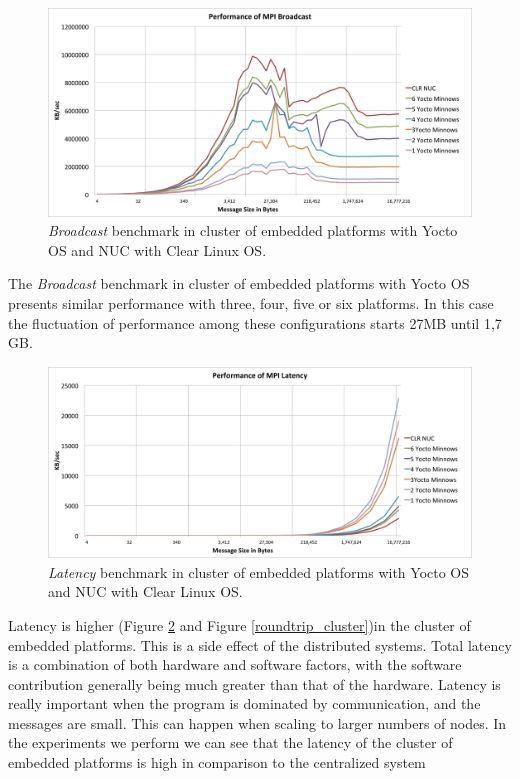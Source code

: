 \begin{figure}
  \includegraphics[width=\paperwidth]{images/mpbench_cluster_experiments/mpi_broadcast.png}
\caption{\textit{Broadcast} benchmark in cluster of embedded platforms with Yocto OS and NUC
with Clear Linux OS.}
\label{broadcast_cluster}
\end{figure}

The \textit{Broadcast} benchmark in cluster of embedded platforms with Yocto OS
presents similar performance with three, four, five or six platforms. In this
case the fluctuation of performance among these configurations starts 27MB
until 1,7 GB.

\begin{figure}
  \includegraphics[width=\paperwidth]{images/mpbench_cluster_experiments/mpi_latency.png}
\caption{\textit{Latency} benchmark in cluster of embedded platforms with Yocto OS and NUC
with Clear Linux OS.}
\label{latency_cluster}
\end{figure}

Latency is higher (Figure \ref{latency_cluster} and Figure
\ref{roundtrip_cluster})in the cluster of embedded platforms.  This is a side
effect of the distributed systems.  Total latency is a combination of both
hardware and software factors, with the software contribution generally being
much greater than that of the hardware. Latency is really important when the
program is dominated by communication, and the messages are small.  This can
happen when scaling to larger numbers of nodes. In the experiments we perform we
can see that the latency of the cluster of embedded platforms is high in
comparison to the centralized system \cite{NUC} 

